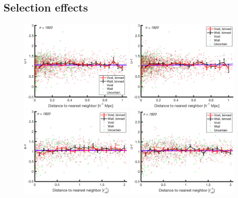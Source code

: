 \subsection{Selection effects}\label{sec:selection_effects}

\begin{figure}
    \includegraphics[width=0.49\textwidth]{Images/smallScaleEnvironment/1sig_dwarf_I06relations_absDist150_ur}
    \includegraphics[width=0.49\textwidth]{Images/smallScaleEnvironment/1sig_dwarf_I06relations_absDist600_ur}
    \includegraphics[width=0.49\textwidth]{Images/smallScaleEnvironment/1sig_dwarf_I06relations_virDist150_ur}
    \includegraphics[width=0.49\textwidth]{Images/smallScaleEnvironment/1sig_dwarf_I06relations_virDist600_ur}

\end{figure}
